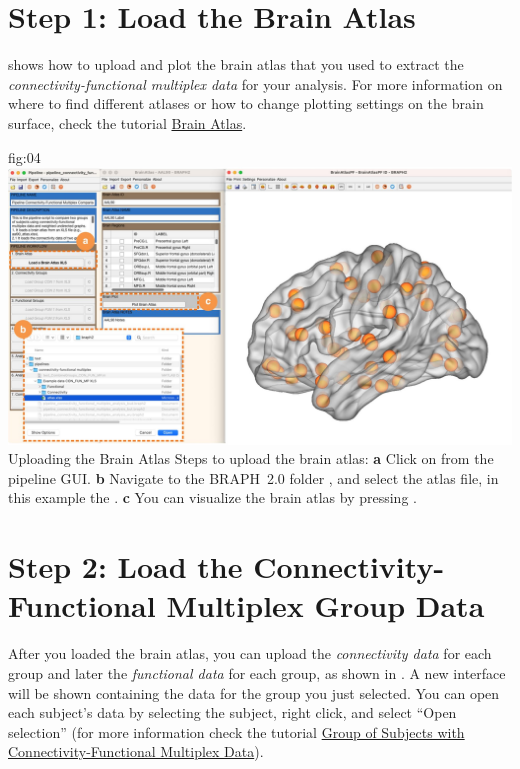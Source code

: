 \documentclass[justified]{tufte-handout}
\begin{document}
\clearpage
\section{Step 1: Load the Brain Atlas}

 shows how to upload and plot the brain atlas that you used to extract the \emph{connectivity-functional multiplex data} for your analysis. For more information on where to find different atlases or how to change plotting settings on the brain surface, check the tutorial \href{https://github.com/braph-software/BRAPH-2/tree/develop/tutorials/general/tut_ba}{Brain Atlas}.

	{fig:04}
	{
	\includegraphics{fig04.jpg}
	}
	{Uploading the Brain Atlas}
	{
	Steps to upload the brain atlas:
	{\bf a} Click on  from the pipeline GUI.
	{\bf b} Navigate to the BRAPH~2.0 folder , and select the atlas file, in this example the .  
	{\bf c} You can visualize the brain atlas by pressing . 
	}
 
\clearpage
\section{Step 2: Load the Connectivity-Functional Multiplex Group Data}

After you loaded the brain atlas, you can upload the \emph{connectivity data} for each group and later the \emph{functional data} for each group, as shown in . A new interface will be shown containing the data for the group you just selected. You can open each subject’s data by selecting the subject, right click, and select “Open selection” (for more information check the tutorial \href{https://github.com/braph-software/BRAPH-2/tree/develop/tutorials/general/tut_gr_con_fun_mp}{Group of Subjects with Connectivity-Functional Multiplex Data}).
\end{document}
